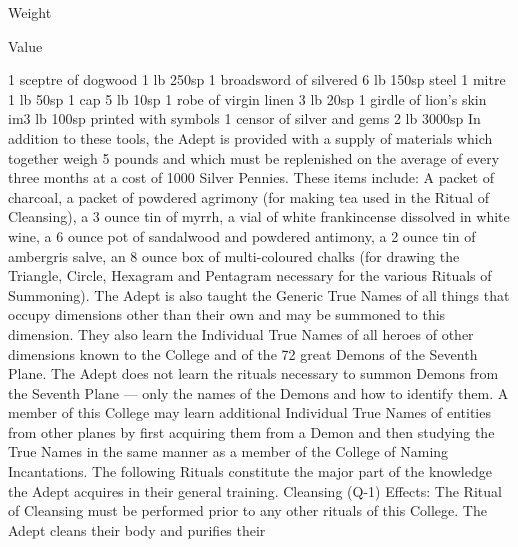 \documentclass[a4paper]{article}
\begin{document}
\begin{multicols}{3}
Weight

Value

1 sceptre of dogwood
1 lb
250sp
1 broadsword of silvered
6 lb
150sp
steel
1 mitre
1 lb
50sp
1 cap
5 lb
10sp
1 robe of virgin linen
3 lb
20sp
1 girdle of lion’s skin im3 lb
100sp
printed with symbols
1 censor of silver and gems
2 lb
3000sp
In addition to these tools, the Adept is provided
with a supply of materials which together weigh 5
pounds and which must be replenished on the
average of every three months at a cost of 1000
Silver Pennies. These items include: A packet of
charcoal, a packet of powdered agrimony (for
making tea used in the Ritual of Cleansing), a 3
ounce tin of myrrh, a vial of white frankincense
dissolved in white wine, a 6 ounce pot of sandalwood and powdered antimony, a 2 ounce tin of
ambergris salve, an 8 ounce box of multi-coloured
chalks (for drawing the Triangle, Circle, Hexagram
and Pentagram necessary for the various Rituals of
Summoning).
The Adept is also taught the Generic True Names
of all things that occupy dimensions other than
their own and may be summoned to this dimension. They also learn the Individual True Names of
all heroes of other dimensions known to the College and of the 72 great Demons of the Seventh
Plane. The Adept does not learn the rituals necessary to summon Demons from the Seventh Plane
— only the names of the Demons and how to identify them. A member of this College may learn
additional Individual True Names of entities from
other planes by first acquiring them from a Demon
and then studying the True Names in the same
manner as a member of the College of Naming
Incantations.
The following Rituals constitute the major part of
the knowledge the Adept acquires in their general
training.
Cleansing (Q-1)
Effects: The Ritual of Cleansing must be performed prior to any other rituals of this College.
The Adept cleans their body and purifies their


\end{multicols}
\end{document}
